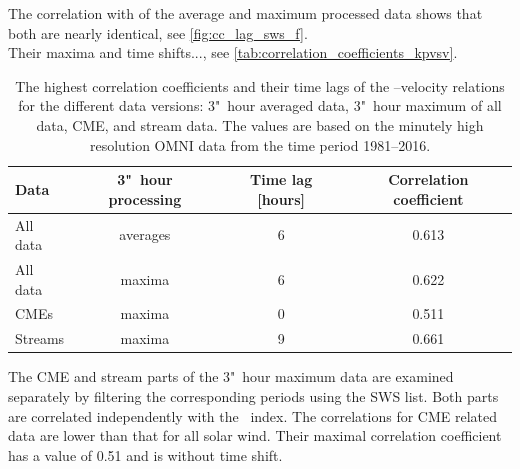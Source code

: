 The correlation with \Kp{} of the average and maximum processed data shows that both are nearly identical, see \autoref{fig:cc_lag_sws_f}.\\
Their maxima and time shifts..., see \autoref{tab:correlation_coefficients_kpvsv}.\\
\begin{table}
	\caption{The highest correlation coefficients and their time lags of the \Kp{}--velocity relations for the different data versions: 3"~hour averaged data, 3"~hour maximum of all data, CME, and stream data. The values are based on the minutely high resolution OMNI data from the time period 1981--2016.}
	\label{tab:correlation_coefficients_kpvsv}
	\centering
	\begin{tabular}{lccc}
		\hline\hline
		Data	&3"~hour processing	&Time lag [hours]	&Correlation coefficient\\
		\hline
		All data	&averages	&6	&0.613\\
		All data	&maxima	&6	&0.622\\
		CMEs	&maxima	&0	&0.511\\
		Streams	&maxima	&9	&0.661\\
		\hline
	\end{tabular}
\end{table}
% 

The CME and stream parts of the 3"~hour maximum data are examined separately by filtering the corresponding periods using the SWS list. Both parts are correlated independently with the \Kp~index. The correlations for CME related data are lower than that for all solar wind. Their maximal correlation coefficient has a value of 0.51 and is without time shift.

